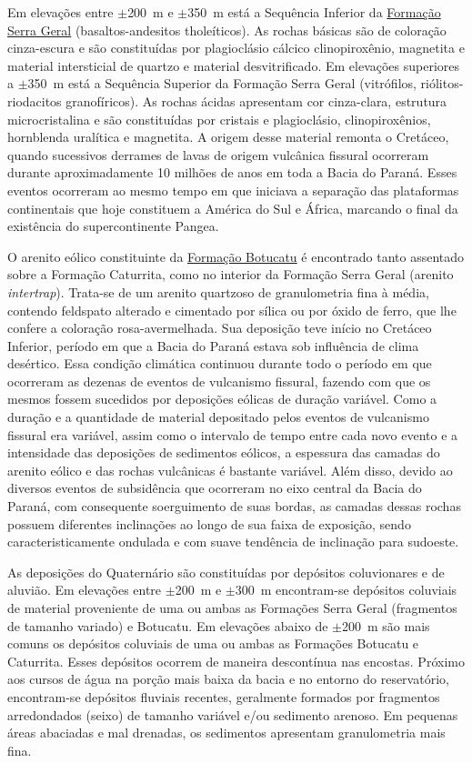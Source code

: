 \documentclass[final]{article}
\begin{document}
Em elevações entre $\pm$200~m e $\pm$350~m está a Sequência Inferior da \href{http://pt.wikipedia.org/wiki/Forma\%C3\%A7\%C3\%A3o_Serra_Geral}{Formação Serra Geral} (basaltos-andesitos tholeíticos). As rochas básicas são de coloração cinza-escura e são constituídas por plagioclásio cálcico clinopiroxênio, magnetita e material intersticial de quartzo e material desvitrificado. Em elevações superiores a $\pm$350~m está a Sequência Superior da Formação Serra Geral (vitrófilos, riólitos-riodacitos granofíricos). As rochas ácidas apresentam cor cinza-clara, estrutura microcristalina e são constituídas por cristais e plagioclásio, clinopiroxênios, hornblenda uralítica e magnetita. A origem desse material remonta o Cretáceo, quando sucessivos derrames de lavas de origem vulcânica fissural ocorreram durante aproximadamente 10 milhões de anos em toda a Bacia do Paraná. Esses eventos ocorreram ao mesmo tempo em que iniciava a separação das plataformas continentais que hoje constituem a América do Sul e África, marcando o final da existência do supercontinente Pangea.

O arenito eólico constituinte da \href{http://pt.wikipedia.org/wiki/Forma\%C3\%A7\%C3\%A3o_Botucatu}{Formação Botucatu} é encontrado tanto assentado sobre a Formação Caturrita, como no interior da Formação Serra Geral (arenito \textit{intertrap}). Trata-se de um arenito quartzoso de granulometria fina à média, contendo feldspato alterado e cimentado por sílica ou por óxido de ferro, que lhe confere a coloração rosa-avermelhada. Sua deposição teve início no Cretáceo Inferior, período em que a Bacia do Paraná estava sob influência de clima desértico. Essa condição climática continuou durante todo o período em que ocorreram as dezenas de eventos de vulcanismo fissural, fazendo com que os mesmos fossem sucedidos por deposições eólicas de duração variável. Como a duração e a quantidade de material depositado pelos eventos de vulcanismo fissural era variável, assim como o intervalo de tempo entre cada novo evento e a intensidade das deposições de sedimentos eólicos, a espessura das camadas do arenito eólico e das rochas vulcânicas é bastante variável. Além disso, devido ao diversos eventos de subsidência que ocorreram no eixo central da Bacia do Paraná, com consequente soerguimento de suas bordas, as camadas dessas rochas possuem diferentes inclinações ao longo de sua faixa de exposição, sendo caracteristicamente ondulada e com suave tendência de inclinação para sudoeste.

As deposições do Quaternário são constituídas por depósitos coluvionares e de aluvião. Em elevações entre $\pm$200~m e $\pm$300~m encontram-se depósitos coluviais de material proveniente de uma ou ambas as Formações Serra Geral (fragmentos de tamanho variado) e Botucatu. Em elevações abaixo de $\pm$200~m são mais comuns os depósitos coluviais de uma ou ambas as Formações Botucatu e Caturrita. Esses depósitos ocorrem de maneira descontínua nas encostas. Próximo aos cursos de água na porção mais baixa da bacia e no entorno do reservatório, encontram-se depósitos fluviais recentes, geralmente formados por fragmentos arredondados (seixo) de tamanho variável e/ou sedimento arenoso. Em pequenas áreas abaciadas e mal drenadas, os sedimentos apresentam granulometria mais fina.
\end{document}
